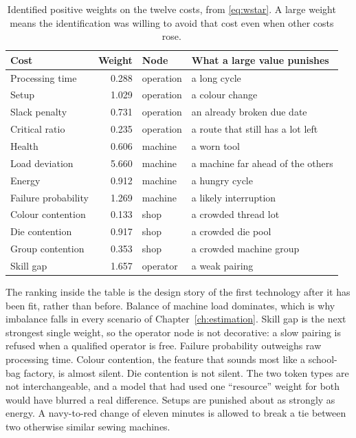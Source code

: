 \begin{table}[ht]
\centering
\caption{Identified positive weights on the twelve costs, from \eqref{eq:wstar}. A large weight means the identification was willing to avoid that cost even when other costs rose.}
\label{tab:weights}
\small
\begin{tabular}{lrll}
\toprule
Cost & Weight & Node & What a large value punishes \\
\midrule
Processing time & 0.288 & operation & a long cycle \\
Setup & 1.029 & operation & a colour change \\
Slack penalty & 0.731 & operation & an already broken due date \\
Critical ratio & 0.235 & operation & a route that still has a lot left \\
Health & 0.606 & machine & a worn tool \\
Load deviation & 5.660 & machine & a machine far ahead of the others \\
Energy & 0.912 & machine & a hungry cycle \\
Failure probability & 1.269 & machine & a likely interruption \\
Colour contention & 0.133 & shop & a crowded thread lot \\
Die contention & 0.917 & shop & a crowded die pool \\
Group contention & 0.353 & shop & a crowded machine group \\
Skill gap & 1.657 & operator & a weak pairing \\
\bottomrule
\end{tabular}
\end{table}

The ranking inside the table is the design story of the first technology after it has been fit, rather than before. Balance of machine load dominates, which is why imbalance falls in every scenario of Chapter~\ref{ch:estimation}. Skill gap is the next strongest single weight, so the operator node is not decorative: a slow pairing is refused when a qualified operator is free. Failure probability outweighs raw processing time. Colour contention, the feature that sounds most like a school-bag factory, is almost silent. Die contention is not silent. The two token types are not interchangeable, and a model that had used one ``resource'' weight for both would have blurred a real difference. Setups are punished about as strongly as energy. A navy-to-red change of eleven minutes is allowed to break a tie between two otherwise similar sewing machines.


